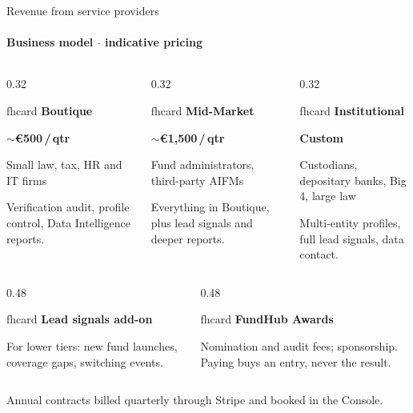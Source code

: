 \documentclass[aspectratio=169,10pt]{beamer}
\newcommand{\fhcard}[2]{%
  \begin{beamercolorbox}[wd=\linewidth,sep=7pt,rounded=true]{fhcard}
    {\small\bfseries\color{fhEmeraldDark}#1}\par\vspace{2pt}\footnotesize #2
  \end{beamercolorbox}}
\newcommand{\fhprice}[4]{%
  \begin{beamercolorbox}[wd=\linewidth,sep=7pt,rounded=true]{fhcard}
    {\small\bfseries\color{fhEmeraldDark}#1}\par\vspace{2pt}
    {\Large\bfseries\color{fhInk}#2}\par\vspace{3pt}
    {\scriptsize\color{fhInkSoft}#3}\par\vspace{3pt}
    \scriptsize #4
  \end{beamercolorbox}}
\begin{document}
\begin{frame}{Revenue from service providers}
  \framesubtitle{Business model $\cdot$ indicative pricing}
  \begin{columns}[T]
    \begin{column}{0.32\textwidth}
      \fhprice{Boutique}{$\sim$\euro{}500\,/\,qtr}{Small law, tax, HR and IT firms}{Verification audit, profile control, Data Intelligence reports.}
    \end{column}
    \begin{column}{0.32\textwidth}
      \fhprice{Mid-Market}{$\sim$\euro{}1,500\,/\,qtr}{Fund administrators, third-party AIFMs}{Everything in Boutique, plus lead signals and deeper reports.}
    \end{column}
    \begin{column}{0.32\textwidth}
      \fhprice{Institutional}{Custom}{Custodians, depositary banks, Big 4, large law}{Multi-entity profiles, full lead signals, data contact.}
    \end{column}
  \end{columns}
  \vspace{3mm}
  \begin{columns}[T]
    \begin{column}{0.48\textwidth}
      \fhcard{Lead signals add-on}{For lower tiers: new fund launches, coverage gaps, switching events.}
    \end{column}
    \begin{column}{0.48\textwidth}
      \fhcard{FundHub Awards}{Nomination and audit fees; sponsorship. Paying buys an entry, never the result.}
    \end{column}
  \end{columns}
  \vspace{2mm}
  {\scriptsize\color{fhSlate}Annual contracts billed quarterly through Stripe and booked in the Console.}
\end{frame}
\end{document}
